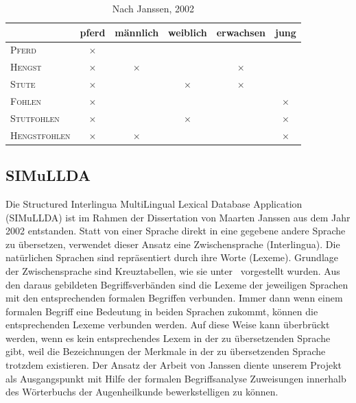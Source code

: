 \documentclass[pagesize,DIV=calc,12pt,draft]{scrreprt}
\begin{document}
\begin{table}[h!]
\centering
\renewcommand{\arraystretch}{2}
\begin{tabular}{@{}lccccc@{}}
\toprule&
pferd &
männlich &
weiblich &
erwachsen &
jung\\
\midrule
\textsc{Pferd}	&	$\times$	&&&&\\

\textsc{Hengst}	&	$\times$	&	$\times$	&&	$\times$	&\\

\textsc{Stute}	&	$\times$	&&	$\times$	&	$\times$	&\\

\textsc{Fohlen}	&	$\times$	&&&&	$\times$\\

\textsc{Stutfohlen}	&	$\times$	&&	$\times$	&&	$\times$\\

\textsc{Hengstfohlen}	&	$\times$	&	$\times$	&&&	$\times$\\
\bottomrule
\end{tabular}
\caption{Nach Janssen, 2002}
\end{table}

\subsection{SIMuLLDA}

Die Structured Interlingua MultiLingual Lexical Database Application (SIMuLLDA) ist im Rahmen der Dissertation von Maarten Janssen aus dem Jahr 2002 entstanden. 
Statt von einer Sprache direkt in eine gegebene andere Sprache zu übersetzen, verwendet dieser Ansatz eine Zwischensprache (Interlingua). 
Die natürlichen Sprachen sind repräsentiert durch ihre Worte (Lexeme). 
Grundlage der Zwischensprache sind Kreuztabellen, wie sie unter\emph{~} vorgestellt wurden. 
Aus den daraus gebildeten Begriffsverbänden sind die Lexeme der jeweiligen Sprachen mit den entsprechenden formalen Begriffen verbunden. 
Immer dann wenn einem formalen Begriff eine Bedeutung in beiden Sprachen zukommt, können die entsprechenden Lexeme verbunden werden. 
Auf diese Weise kann überbrückt werden, wenn es kein entsprechendes Lexem in der zu übersetzenden Sprache gibt, weil die Bezeichnungen der Merkmale in der zu übersetzenden Sprache trotzdem existieren. 
Der Ansatz der Arbeit von Janssen diente unserem Projekt als Ausgangspunkt mit Hilfe der formalen Begriffsanalyse Zuweisungen innerhalb des Wörterbuchs der Augenheilkunde bewerkstelligen zu können. 
\end{document}
